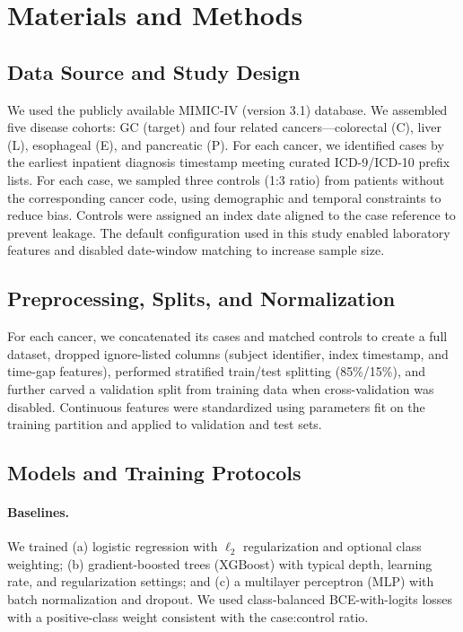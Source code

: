 \documentclass[journal,article,submit,pdftex,moreauthors]{Definitions/mdpi}
\begin{document}



\section{Materials and Methods}
\subsection{Data Source and Study Design}
We used the publicly available MIMIC-IV (version 3.1) database. We assembled five disease cohorts: GC (target) and four related cancers---colorectal (C), liver (L), esophageal (E), and pancreatic (P). For each cancer, we identified cases by the earliest inpatient diagnosis timestamp meeting curated ICD-9/ICD-10 prefix lists. For each case, we sampled three controls (1:3 ratio) from patients without the corresponding cancer code, using demographic and temporal constraints to reduce bias. Controls were assigned an index date aligned to the case reference to prevent leakage. The default configuration used in this study enabled laboratory features and disabled date-window matching to increase sample size.




\subsection{Preprocessing, Splits, and Normalization}
For each cancer, we concatenated its cases and matched controls to create a full dataset, dropped ignore-listed columns (subject identifier, index timestamp, and time-gap features), performed stratified train/test splitting (85\%/15\%), and further carved a validation split from training data when cross-validation was disabled. Continuous features were standardized using parameters fit on the training partition and applied to validation and test sets.


\subsection{Models and Training Protocols}
\paragraph{Baselines.} We trained (a) logistic regression with $\ell_2$ regularization and optional class weighting; (b) gradient-boosted trees (XGBoost) with typical depth, learning rate, and regularization settings; and (c) a multilayer perceptron (MLP) with batch normalization and dropout. We used class-balanced BCE-with-logits losses with a positive-class weight consistent with the case:control ratio.
\end{document}
